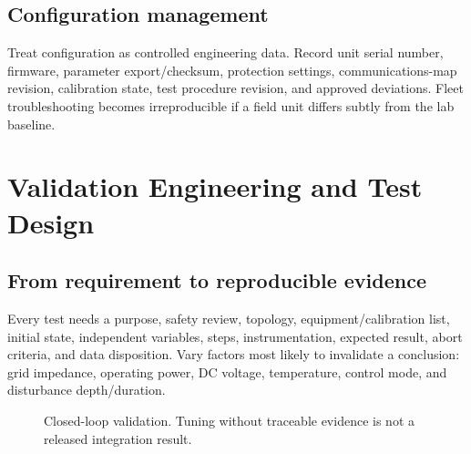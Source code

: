 \documentclass[11pt]{article}
\begin{document}
\subsection{Configuration management}
Treat configuration as controlled engineering data. Record unit serial number,
firmware, parameter export/checksum, protection settings, communications-map
revision, calibration state, test procedure revision, and approved deviations.
Fleet troubleshooting becomes irreproducible if a field unit differs subtly
from the lab baseline.

\section{Validation Engineering and Test Design}

\subsection{From requirement to reproducible evidence}
Every test needs a purpose, safety review, topology, equipment/calibration list,
initial state, independent variables, steps, instrumentation, expected result,
abort criteria, and data disposition. Vary factors most likely to invalidate a
conclusion: grid impedance, operating power, DC voltage, temperature, control
mode, and disturbance depth/duration.

\begin{figure}[h]
\centering
{}
\caption{Closed-loop validation. Tuning without traceable evidence is not a released integration result.}
\end{figure}
\end{document}
